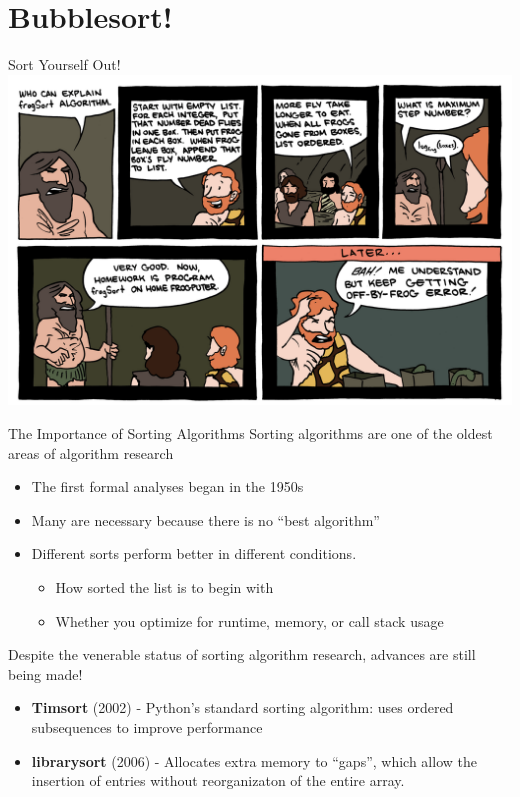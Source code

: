 \documentclass[11pt]{beamer}
\begin{document}
\section[Bubble]{Bubblesort!}
\begin{frame}{Sort Yourself Out!}
\center
\includegraphics[scale=0.2]{frogsort.png}
\end{frame}

\begin{frame}{The Importance of Sorting Algorithms}
Sorting algorithms are one of the oldest areas of algorithm research
\begin{itemize}
\item The first formal analyses began in the 1950s
\item Many are necessary because there is no ``best algorithm''
\item Different sorts perform better in different conditions.
\begin{itemize}
\item How sorted the list is to begin with
\item Whether you optimize for runtime, memory, or call stack usage
\end{itemize}
\end{itemize}
Despite the venerable status of sorting algorithm research, advances are still being made!
\begin{itemize}
\item \textbf{Timsort} (2002) - Python's standard sorting algorithm: uses ordered subsequences to improve performance
\item \textbf{librarysort} (2006) - Allocates extra memory to ``gaps'', which allow the insertion of entries without reorganizaton of the entire array.
\end{itemize}
\end{frame}
\end{document}
